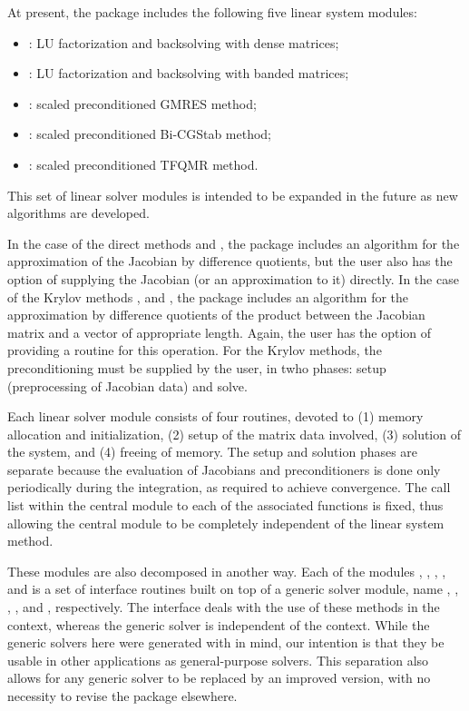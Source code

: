 At present, the package includes the following five {\kinsol} linear system
modules:
\begin{itemize}
\item {\kindense}: LU factorization and backsolving with dense matrices;
\item {\kinband}: LU factorization and backsolving with banded matrices;
\item {\kinspgmr}: scaled preconditioned GMRES method;
\item {\kinspbcg}: scaled preconditioned Bi-CGStab method;
\item {\kinsptfqmr}: scaled preconditioned TFQMR method.
\end{itemize}
This set of linear solver modules is intended to be expanded in the
future as new algorithms are developed.

In the case of the direct methods {\kindense} and {\kinband}, the package includes
an algorithm for the approximation of the Jacobian by difference quotients, but
the user also has the option of supplying the Jacobian (or an approximation to it)
directly. In the case of the Krylov methods {\kinspgmr}, {\kinspbcg} and {\kinsptfqmr},
the package includes an algorithm for the approximation by difference quotients of the
product between the Jacobian matrix and a vector of appropriate length. Again, the user
has the option of providing a routine for this operation.
For the Krylov methods, 
the preconditioning must be supplied by the user, in twho phases:
setup (preprocessing of Jacobian data) and solve.

Each {\kinsol} linear solver module consists of four routines, devoted to (1)
memory allocation and initialization, (2) setup of the matrix data
involved, (3) solution of the system, and (4) freeing of memory.
The setup and solution phases are separate because the evaluation of
Jacobians and preconditioners is done only periodically during the
integration, as required to achieve convergence. The call list within
the central {\kinsol} module to each of the associated functions is
fixed, thus allowing the central module to be completely independent
of the linear system method.

These modules are also decomposed in another way.
Each of the modules {\kindense}, {\kinband}, {\kinspgmr}, {\kinspbcg}, and {\kinsptfqmr}
is a set of interface routines built on top of a generic solver module,
name {\dense}, {\band}, {\spgmr}, {\spbcg}, and {\sptfqmr}, respectively.
The interface deals with the use of these methods in the {\kinsol} context,
whereas the generic solver is independent of the context.
While the generic solvers here were generated with {\sundials} in mind, our
intention is that they be usable in other applications as
general-purpose solvers.  This separation also allows for any generic
solver to be replaced by an improved version, with no necessity to
revise the {\kinsol} package elsewhere.

